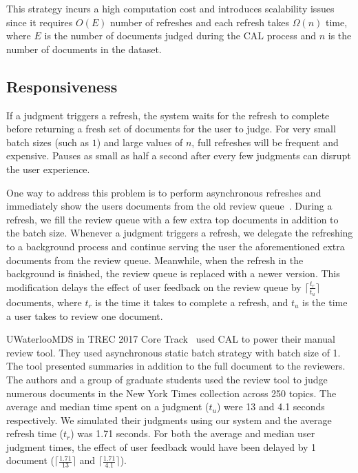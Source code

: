 This strategy incurs a high computation cost and introduces scalability issues
since it requires $O(E)$ number of refreshes and each refresh takes $\Omega(n)$
time, where $E$ is the number of documents judged during the CAL process and
$n$ is the number of documents in the dataset.

\subsection{Responsiveness}
\label{sec:async}
If a judgment triggers a refresh, the system waits for the refresh to complete
before returning a fresh set of documents for the user to judge.
For very small batch sizes (such as $1$) and large values of $n$, full refreshes
will be frequent and expensive. Pauses as small as half a second after every few
judgments can disrupt the user experience.

One way to address this problem is to perform asynchronous refreshes and
immediately show the users documents from the old review
queue~\cite{sigirdemo}. During a refresh, we fill the review queue
with a few extra top documents in addition to the batch size. Whenever a judgment
triggers a refresh, we delegate the refreshing to a background process and
continue serving the user the aforementioned extra documents from the review
queue. Meanwhile, when the refresh in the background is finished, the review
queue is replaced with a newer version. This modification delays the effect of
user feedback on the review queue by $\lceil\frac{t_r}{t_u}\rceil$ documents,
where $t_r$ is the time it takes to complete a refresh, and $t_u$ is the time a
user takes to review one document.

UWaterlooMDS in TREC 2017 Core Track~\cite{zhang2017uwaterloomds} used CAL to
power their manual review tool.  They used asynchronous static batch strategy
with batch size of 1. The tool presented summaries in addition to the full
document to the reviewers.  The authors and a group of graduate students used
the review tool to judge numerous documents in the New York Times collection
across 250 topics. The average and median time spent on a judgment ($t_u$) were 13 and
4.1 seconds respectively. We simulated their judgments using our system and the
average refresh time ($t_r$) was 1.71 seconds. For both the average and median user
judgment times, the effect of user feedback would have been delayed by 1 document
($\lceil\frac{1.71}{13}\rceil$ and $\lceil\frac{1.71}{4.1}\rceil$).

